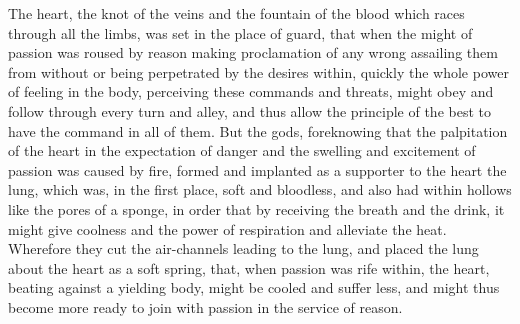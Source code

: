 \documentclass[11pt,letter]{article}
\begin{document}
\par  The heart, the knot of the veins and the fountain of the blood which races through all the limbs, was set in the place of guard, that when the might of passion was roused by reason making proclamation of any wrong assailing them from without or being perpetrated by the desires within, quickly the whole power of feeling in the body, perceiving these commands and threats, might obey and follow through every turn and alley, and thus allow the principle of the best to have the command in all of them. But the gods, foreknowing that the palpitation of the heart in the expectation of danger and the swelling and excitement of passion was caused by fire, formed and implanted as a supporter to the heart the lung, which was, in the first place, soft and bloodless, and also had within hollows like the pores of a sponge, in order that by receiving the breath and the drink, it might give coolness and the power of respiration and alleviate the heat. Wherefore they cut the air-channels leading to the lung, and placed the lung about the heart as a soft spring, that, when passion was rife within, the heart, beating against a yielding body, might be cooled and suffer less, and might thus become more ready to join with passion in the service of reason.
\end{document}
